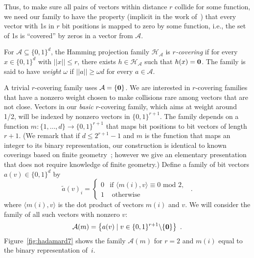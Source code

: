 \documentclass[prodmode,acmtalg]{acmsmall}
\begin{document}
Thus, to make sure all pairs of vectors within distance $r$ collide for some function, we need our family to have the property (implicit in the work of~\cite{Arasu_VLDB06}) that every vector with 1s in $r$ bit positions is mapped to zero by some function, i.e., the set of 1s is ``covered'' by zeros in a vector from $\mathcal{A}$.

\begin{definition}\label{def:covering}
For $\mathcal{A} \subseteq \{0,1\}^d$, the Hamming projection family $\mathcal{H}_\mathcal{A}$ is \emph{$r$-covering} if for every $x \in \{0,1\}^d$ with $||x|| \leq r$, there exists $h\in \mathcal{H}_\mathcal{A}$ such that $h(x) = {\bf 0}$.
The family is said to have \emph{weight} $\omega$ if $||a||\geq \omega d$ for every $a\in\mathcal{A}$.
\end{definition}

A trivial $r$-covering family uses $\mathcal{A} = \{{\bf 0}\}$.
We are interested in $r$-covering families that have a nonzero weight chosen to make collisions rare among vectors that are not close.
Vectors in our \emph{basic} $r$-covering family, which aims at weight around 1/2, will be indexed by nonzero vectors in $\{0,1\}^{r+1}$.
The family depends on a function $m: \{1,\dots,d\} \rightarrow \{0,1\}^{r+1}$ that maps bit positions to bit vectors of length~$r+1$. 
(We remark that if $d \leq 2^{r+1}-1$ and $m$ is the function that maps an integer to its binary representation, our construction is identical to known coverings based on finite geometry~\cite{gordon1995new}; however we give an elementary presentation that does not require knowledge of finite geometry.)
Define a family of bit vectors $a(v) \in \{0,1\}^d$ by
\begin{equation}\label{def:A_v}
 \tilde{a}(v)_i = \left\{ \begin{array}{ll}
 0 & \text{if } \langle m(i),v\rangle \equiv 0 \text{ mod } 2,\\
 1 & \text{ otherwise}
 \end{array} \right. \enspace .
\end{equation}
where $\langle m(i), v\rangle$ is the dot product of vectors $ m(i)$ and $v$.
We will consider the family of all such vectors with nonzero $v$:
\begin{equation*}\mathcal{A}(m) = \big\{ a(v) \; | \; v\in \{0,1\}^{r+1} \backslash \{{\bf 0}\} \big\} \enspace .
\end{equation*}
Figure~\ref{fig:hadamard7} shows the family $\mathcal{A}(m)$ for $r=2$ and $m(i)$ equal to the binary representation of~$i$.
\end{document}
